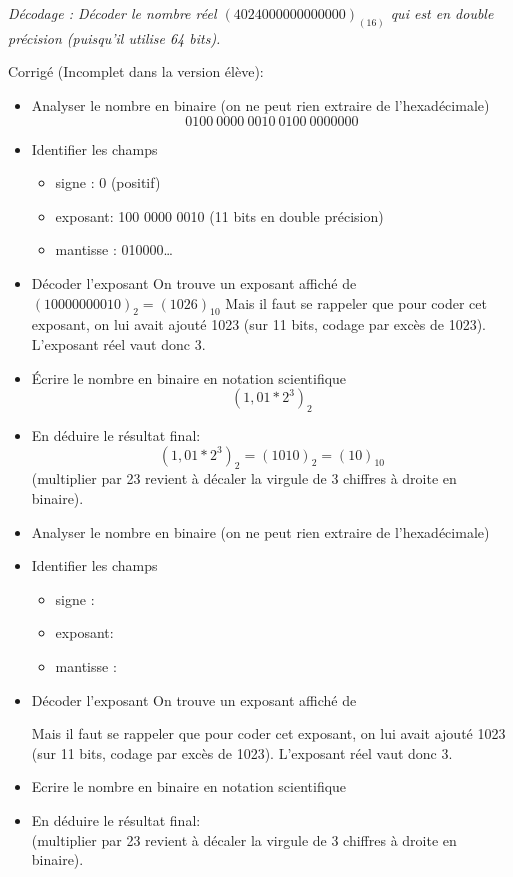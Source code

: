 \documentclass[10pt,fleqn]{article} %
\begin{document}
\begin{exercice}
\textit{Décodage : Décoder le nombre réel $(4024000000000000)_{(16)}$ qui est en double précision (puisqu’il utilise 64 bits).}



\ifprof
Corrigé (Incomplet dans la version élève):
\begin{itemize}
\item Analyser le nombre en binaire (on ne peut rien extraire de l’hexadécimale)
$$0100\ 0000\ 0010\ 0100\ 0000000$$
\item Identifier les champs
\begin{itemize}
\item signe : 0 (positif)
\item exposant: 100 0000 0010 (11 bits en double précision)
\item mantisse : 010000…
\end{itemize}
\item Décoder l’exposant
On trouve un exposant affiché de $(100 0000 0010)_2 = (1026)_{10}$
Mais il faut se rappeler que pour coder cet exposant, on lui avait ajouté 1023 (sur 11 bits, 
codage par excès de 1023).
L’exposant réel vaut donc 3.
\item Écrire le nombre en binaire en notation scientifique
$$(1,01*2^3
)_2$$
\item En déduire le résultat final:
$$(1,01*2^3
)_2 = (1010)_2 = (10)_{10}$$
(multiplier par 23 revient à décaler la virgule de 3 chiffres à droite en binaire).
\end{itemize}
\else
\begin{itemize}
\item Analyser le nombre en binaire (on ne peut rien extraire de l’hexadécimale)
$$ $$
\item Identifier les champs
\begin{itemize}
\item signe :  
\item exposant: 
\item mantisse : 
\end{itemize}
\item Décoder l’exposant
On trouve un exposant affiché de $ $

Mais il faut se rappeler que pour coder cet exposant, on lui avait ajouté 1023 (sur 11 bits, 
codage par excès de 1023).
L’exposant réel vaut donc 3.
\item Ecrire le nombre en binaire en notation scientifique
$$  $$
\item En déduire le résultat final:
$$ $$
(multiplier par 23 revient à décaler la virgule de 3 chiffres à droite en binaire).
\end{itemize}
\fi
\end{exercice}
\end{document}
